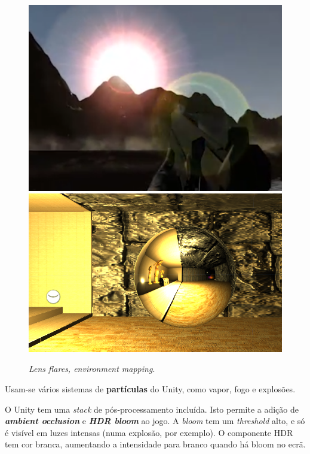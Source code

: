 \documentclass{article}
\begin{document}
        \begin{figure}[h]\begin{center}
            \includegraphics[scale=0.15]{flares.png}
            \includegraphics[scale=0.24]{Screenshot_2.png}
            \caption{\textit{Lens flares, environment mapping}.}
        \end{center}\end{figure}
        \par
        Usam-se vários sistemas de \textbf{partículas} do Unity, como vapor, fogo e explosões.
        \par
        O Unity tem uma \textit{stack} de pós-processamento incluída. Isto permite a adição de \textbf{\textit{ambient occlusion}} e \textbf{\textit{HDR bloom}} ao jogo. A \textit{bloom} tem um \textit{threshold} alto, e só é visível em luzes intensas (numa explosão, por exemplo). O componente HDR tem cor branca, aumentando a intensidade para branco quando há bloom no ecrã.
\end{document}
